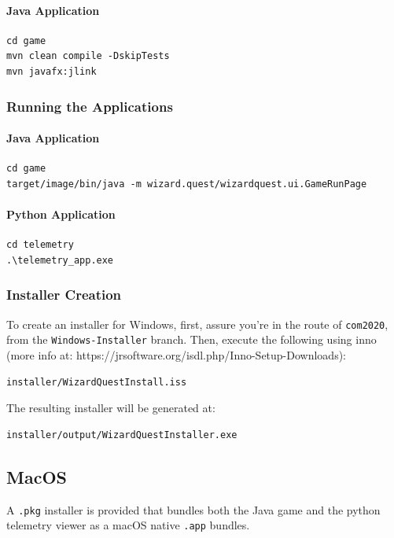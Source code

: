\documentclass[11pt]{article}
\begin{document}
\paragraph{Java Application}
\begin{verbatim}
cd game
mvn clean compile -DskipTests
mvn javafx:jlink
\end{verbatim}

\subsubsection{Running the Applications}

\paragraph{Java Application}
\begin{verbatim}
cd game
target/image/bin/java -m wizard.quest/wizardquest.ui.GameRunPage
\end{verbatim}

\paragraph{Python Application}
\begin{verbatim}
cd telemetry
.\telemetry_app.exe
\end{verbatim}

\subsubsection{Installer Creation}
To create an installer for Windows, first, assure you're in the route of \texttt{com2020}, from the \texttt{Windows-Installer} branch. Then, execute the following using inno \\(more info at: https://jrsoftware.org/isdl.php/Inno-Setup-Downloads):

\begin{verbatim}
installer/WizardQuestInstall.iss
\end{verbatim}

The resulting installer will be generated at:

\begin{verbatim}
installer/output/WizardQuestInstaller.exe
\end{verbatim}

\subsection{MacOS}
A  \verb|.pkg| installer is provided that bundles both the Java game and the python telemetry viewer as a macOS native \verb|.app| bundles.
\end{document}
